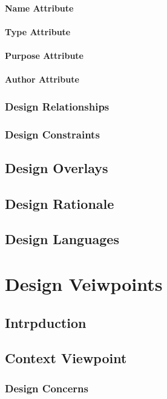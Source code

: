 \documentclass[letterpaper,10pt,titlepage,draftclsnofoot,onecolumn,onesided] {IEEEtran}
\begin{document}
\paragraph{Name Attribute}
\paragraph{Type Attribute}
\paragraph{Purpose Attribute}
\paragraph{Author Attribute}
\subsubsection{Design Relationships}
\subsubsection{Design Constraints}

\subsection{Design Overlays}

\subsection{Design Rationale}

\subsection{Design Languages}

\section{Design Veiwpoints}

\subsection{Intrpduction}

\subsection{Context Viewpoint}
\subsubsection{Design Concerns}
\end{document}
